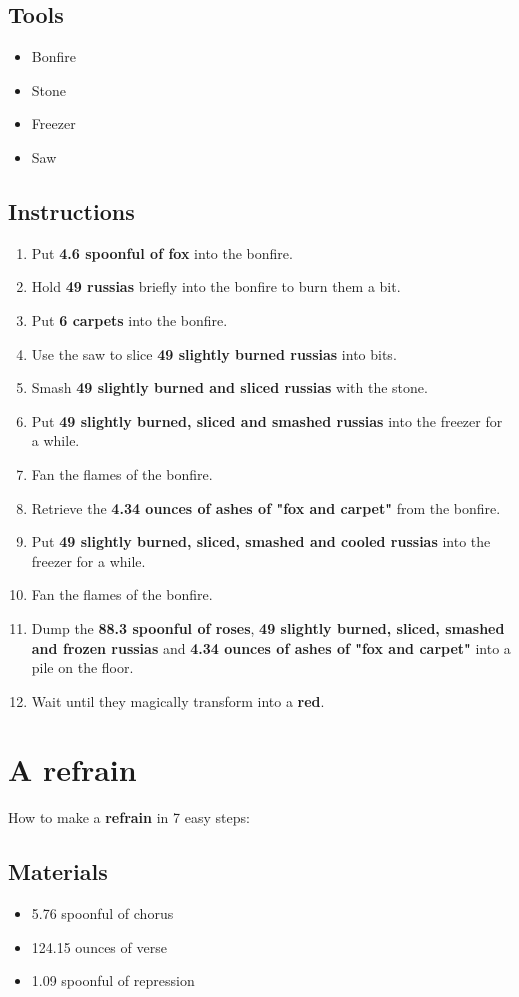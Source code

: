 \documentclass{article}
\begin{document}
\subsection{Tools}\begin{itemize}
\item 
Bonfire
\item 
Stone
\item 
Freezer
\item 
Saw
\end{itemize}
\subsection{Instructions}\begin{enumerate}
\item 
Put \textbf{4.6 spoonful of fox} into the bonfire.
\item 
Hold \textbf{49 russias} briefly into the bonfire to burn them a bit.
\item 
Put \textbf{6 carpets} into the bonfire.
\item 
Use the saw to slice \textbf{49 slightly burned russias} into bits.
\item 
Smash \textbf{49 slightly burned and sliced russias} with the stone.
\item 
Put \textbf{49 slightly burned, sliced and smashed russias} into the freezer for a while.
\item 
Fan the flames of the bonfire.
\item 
Retrieve the \textbf{4.34 ounces of ashes of "fox and carpet"} from the bonfire.
\item 
Put \textbf{49 slightly burned, sliced, smashed and cooled russias} into the freezer for a while.
\item 
Fan the flames of the bonfire.
\item 
Dump the \textbf{88.3 spoonful of roses}, \textbf{49 slightly burned, sliced, smashed and frozen russias} and \textbf{4.34 ounces of ashes of "fox and carpet"} into a pile on the floor.
\item 
Wait until they magically transform into a \textbf{red}.
\end{enumerate}
\newpage
\section{A refrain}How to make a \textbf{refrain} in 7 easy steps:

\subsection{Materials}\begin{itemize}
\item 
5.76 spoonful of chorus
\item 
124.15 ounces of verse
\item 
1.09 spoonful of repression
\end{itemize}
\end{document}
